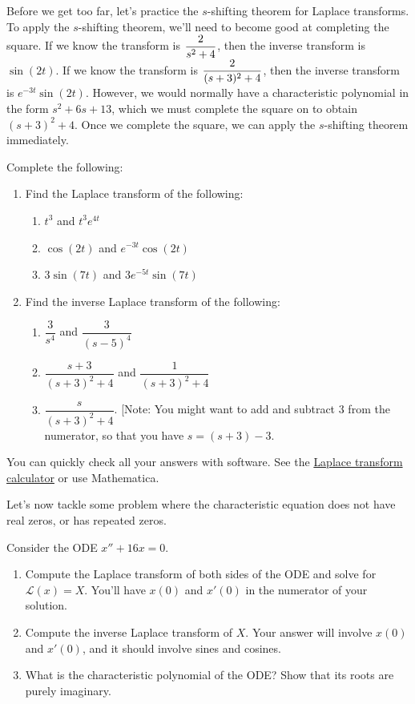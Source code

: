 Before we get too far, let's practice the $s$-shifting theorem for Laplace transforms.
To apply the $s$-shifting theorem, we'll need to become good at completing the square.  
If we know the transform is $\displaystyle\frac{2}{s^2+4}$, then the inverse transform is $\sin(2t)$. 
If we know the transform is $\displaystyle\frac{2}{(s+3)^2+4}$, then the inverse transform is $e^{-3t}\sin(2t)$. 
However, we would normally have a characteristic polynomial in the form $s^2+6s+13$, which we must complete the square on to obtain $(s+3)^2+4$. 
Once we complete the square, we can apply the $s$-shifting theorem immediately.
\begin{problem}
 Complete the following:
\begin{enumerate}
 \item Find the Laplace transform of the following:
\begin{enumerate}
 \item $t^3$ and $ t^3 e^{4t}$
 \item $\cos(2t)$ and $e^{-3t}\cos(2t)$
 \item $3\sin(7t)$ and $3e^{-5t}\sin(7t)$ 
\end{enumerate}
 \item Find the inverse Laplace transform of the following:
\begin{enumerate}
 \item $\dfrac{3}{s^4}$ and $\dfrac{3}{(s-5)^4}$
 \item $\dfrac{s+3}{(s+3)^2+4}$ and $\dfrac{1}{(s+3)^2+4}$
 \item $\dfrac{s}{(s+3)^2+4}$. [Note:  You might want to add and subtract 3 from the numerator, so that you have $s=(s+3)-3$.  
\end{enumerate}
\end{enumerate}
You can quickly check all your answers with software. See the \href{\urllaplacetransforms}{Laplace transform calculator} or use Mathematica. 
\end{problem}



Let's now tackle some problem where the characteristic equation does not have real zeros, or has repeated zeros. 
\begin{problem}
 Consider the ODE $x''+16x=0$. 
 \begin{enumerate}
 \item Compute the Laplace transform of both sides of the ODE and solve for $\mathscr{L}(x) = X$. You'll have $x(0)$ and $x'(0)$ in the numerator of your solution. 
 \item Compute the inverse Laplace transform of $X$. Your answer will involve $x(0)$ and $x'(0)$, and it should involve sines and cosines. 
 \item What is the characteristic polynomial of the ODE?  Show that its roots are purely imaginary.
\end{enumerate} 
\end{problem}

